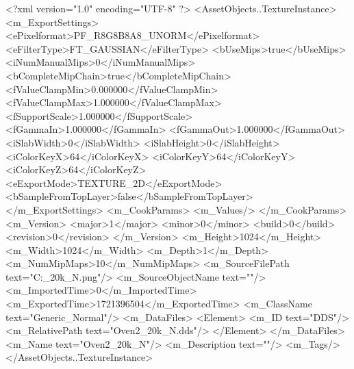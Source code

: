 <?xml version="1.0" encoding="UTF-8" ?>
<AssetObjects..TextureInstance>
	<m_ExportSettings>
		<ePixelformat>PF_R8G8B8A8_UNORM</ePixelformat>
		<eFilterType>FT_GAUSSIAN</eFilterType>
		<bUseMips>true</bUseMips>
		<iNumManualMips>0</iNumManualMips>
		<bCompleteMipChain>true</bCompleteMipChain>
		<fValueClampMin>0.000000</fValueClampMin>
		<fValueClampMax>1.000000</fValueClampMax>
		<fSupportScale>1.000000</fSupportScale>
		<fGammaIn>1.000000</fGammaIn>
		<fGammaOut>1.000000</fGammaOut>
		<iSlabWidth>0</iSlabWidth>
		<iSlabHeight>0</iSlabHeight>
		<iColorKeyX>64</iColorKeyX>
		<iColorKeyY>64</iColorKeyY>
		<iColorKeyZ>64</iColorKeyZ>
		<eExportMode>TEXTURE_2D</eExportMode>
		<bSampleFromTopLayer>false</bSampleFromTopLayer>
	</m_ExportSettings>
	<m_CookParams>
		<m_Values/>
	</m_CookParams>
	<m_Version>
		<major>1</major>
		<minor>0</minor>
		<build>0</build>
		<revision>0</revision>
	</m_Version>
	<m_Height>1024</m_Height>
	<m_Width>1024</m_Width>
	<m_Depth>1</m_Depth>
	<m_NumMipMaps>10</m_NumMipMaps>
	<m_SourceFilePath text="C:\Users\Shadow\Desktop\Prototypes{}_20k_N.png"/>
	<m_SourceObjectName text=""/>
	<m_ImportedTime>0</m_ImportedTime>
	<m_ExportedTime>1721396504</m_ExportedTime>
	<m_ClassName text="Generic_Normal"/>
	<m_DataFiles>
		<Element>
			<m_ID text="DDS"/>
			<m_RelativePath text="Oven2_20k_N.dds"/>
		</Element>
	</m_DataFiles>
	<m_Name text="Oven2_20k_N"/>
	<m_Description text=""/>
	<m_Tags/>
</AssetObjects..TextureInstance>

